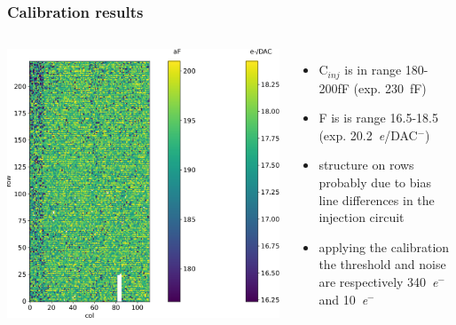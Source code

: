     \begin{frame}
        \frametitle{Calibration results}
        \begin{columns}
            \includegraphics[width=1.1\linewidth]{figures/charaterization/conversion_factor_map.pdf}
            \begin{itemize}
                \item C$_{inj}$ is in range 180-200\si{fF} (exp. \SI{230}{fF})
                \item F is is range 16.5-18.5 (exp. \SI{20.2}{\elementarycharge/DAC}$^-$)
                \item structure on rows probably due to bias line differences in the injection circuit 
                \item applying the calibration the threshold and noise are respectively \SI{340}{\elementarycharge}$^-$ and \SI{10}{\elementarycharge}$^-$
            \end{itemize}
        \end{columns}
    \end{frame}


